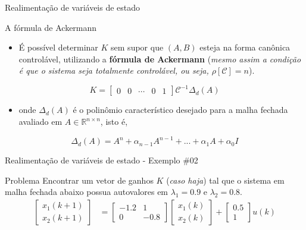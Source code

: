 \begin{frame}{Realimentação de variáveis de estado}
\begin{block}{A fórmula de Ackermann}
\begin{itemize}
    \item É possível determinar $K$ sem supor que $(A,B)$ esteja na forma canônica controlável, utilizando a \textbf{fórmula de Ackermann} (\textit{mesmo assim a condição é que o sistema seja totalmente  controlável, ou seja, $\rho[\mathcal{C}] = n$}).
\end{itemize}
$$\boxed{K = \begin{bmatrix}
    0 & 0 & \cdots & 0 & 1
    \end{bmatrix} \mathcal{C}^{-1}\Delta_d(A)}$$
\vspace{-0.3cm}
\begin{itemize}
    \item[] onde $\Delta_d(A)$ é o polinômio característico desejado para a malha fechada avaliado em $A \in \mathbb{R}^{n \times n}$, isto é,
\end{itemize}
\vspace{0.2cm}
$$\Delta_d(A) = A^n + \alpha_{n-1}A^{n-1} + ... + \alpha_1A + \alpha_0I$$
\end{block}
\end{frame}

\begin{frame}{Realimentação de variáveis de estado - Exemplo \#02}
\begin{block}{Problema}
Encontrar um vetor de ganhos $K$ (\textit{caso haja}) tal que o sistema em malha fechada abaixo possua autovalores em $\lambda_1 = \num{0,9}$ e $\lambda_2 = \num{0,8}$.
\begin{align*}
    \begin{bmatrix} x_1(k+1) \\ x_2(k+1) \end{bmatrix}
    &=
    \begin{bmatrix}
    -\num{1,2} & 1 \\ 0 & -\num{0,8}
    \end{bmatrix}
    \begin{bmatrix}
    x_1(k) \\ x_2(k)
    \end{bmatrix}
    +
    \begin{bmatrix}
    \num{0,5} \\ 1
    \end{bmatrix}
    u(k)
\end{align*}
\end{block}
\end{frame}

